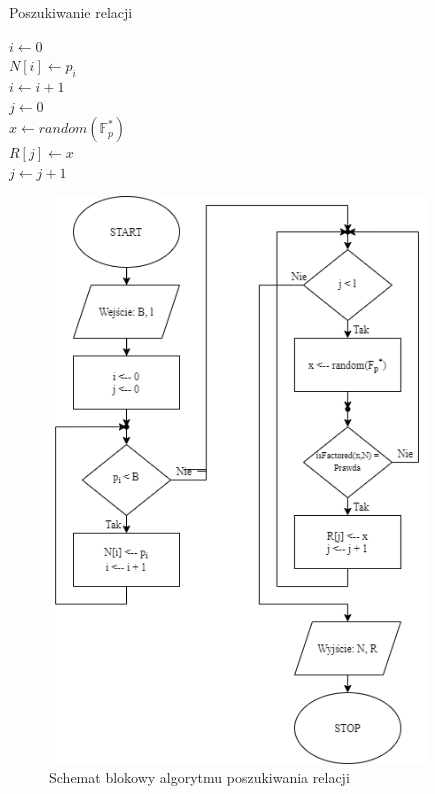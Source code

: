 \documentclass[]{article}
\begin{document}
\begin{algorithm}
	\SetAlgoLined
	\caption{Poszukiwanie relacji}
	\label{Relation}
	\(i \gets 0\) \\
	{
		\(N[i] \gets p_i\)\\
		\(i \gets i + 1\)\\
	}
	\(j \gets 0\) \\
	{
		\(x \gets random(\mathbb{F}_p^*)\)\\
		{
			\(R[j] \gets x\)\\
			\(j \gets j + 1\)\\
		}
	}
\end{algorithm}

\begin{figure}[h]
	\begin{center}
		\includegraphics[width=10cm]{./img/2.png}
		\caption{Schemat blokowy algorytmu poszukiwania relacji}
	\end{center}
\end{figure}
\end{document}
